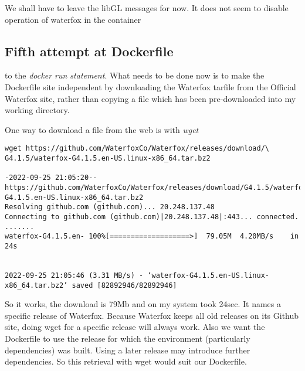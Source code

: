 \documentclass{article}  %
\begin{document}
We shall have to leave the libGL messages for now. It does not seem to disable operation of waterfox in the container

\subsection{Fifth attempt at Dockerfile}
to the {\em docker run statement}. 
What needs to be done now is to make the Dockerfile site independent by downloading the Waterfox tarfile from the Official Waterfox site, rather than copying a file which has been pre-downloaded into my working directory. 

One way to download a file from the web is with {\em wget}
\begin{verbatim}
wget https://github.com/WaterfoxCo/Waterfox/releases/download/\
G4.1.5/waterfox-G4.1.5.en-US.linux-x86_64.tar.bz2

-2022-09-25 21:05:20--  https://github.com/WaterfoxCo/Waterfox/releases/download/G4.1.5/waterfox-G4.1.5.en-US.linux-x86_64.tar.bz2
Resolving github.com (github.com)... 20.248.137.48
Connecting to github.com (github.com)|20.248.137.48|:443... connected.
.......
waterfox-G4.1.5.en- 100%[===================>]  79.05M  4.20MB/s    in 24s     


2022-09-25 21:05:46 (3.31 MB/s) - ‘waterfox-G4.1.5.en-US.linux-x86_64.tar.bz2’ saved [82892946/82892946]
\end{verbatim}
 So it works, the download is 79Mb and on my system took 24sec.  It names a specific release of Waterfox. Because Waterfox keeps all old releases on its Github site, doing wget for a specific release will always work. Also we want the Dockerfile to use the release for which the environment (particularly dependencies) was built. Using a later release may introduce further dependencies. So this retrieval with wget would suit our Dockerfile.
\end{document}

